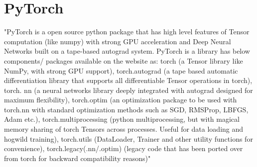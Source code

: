 \section{PyTorch}

"PyTorch is a open source python package that has high level features of Tensor computation 
(like numpy) with strong GPU acceleration and Deep Neural Networks built on a tape-based autograd 
system. PyTorch is a library has below components/ packages available on the website as: torch 
(a Tensor library like NumPy, with strong GPU support), torch.autograd (a tape based automatic
differentiation library that supports all differentiable Tensor operations in torch), torch.
nn (a neural networks library deeply integrated with autograd designed for maximum flexibility), 
torch.optim (an optimization package to be used with torch.nn with standard optimization methods
such as SGD, RMSProp, LBFGS, Adam etc.), torch.multiprocessing (python multiprocessing, but with
magical memory sharing of torch Tensors across processes. Useful for data loading and 
hogwild training), torch.utils (DataLoader, Trainer and other utility functions for convenience),
torch.legacy(.nn/.optim) (legacy code that has been ported over from torch for backward 
compatibility reasons)"~\cite{PyTorch}
